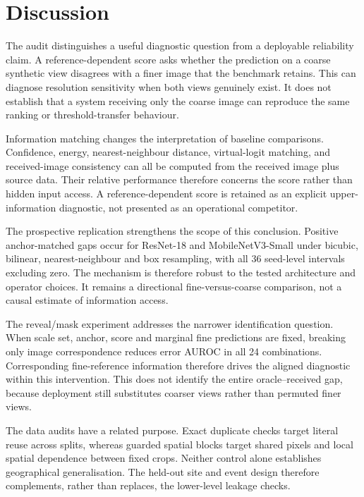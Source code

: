 \section{Discussion}

The audit distinguishes a useful diagnostic question from a deployable
reliability claim. A reference-dependent score asks whether the prediction on a
coarse synthetic view disagrees with a finer image that the benchmark retains.
This can diagnose resolution sensitivity when both views genuinely exist. It
does not establish that a system receiving only the coarse image can reproduce
the same ranking or threshold-transfer behaviour.

Information matching changes the interpretation of baseline comparisons.
Confidence, energy, nearest-neighbour distance, virtual-logit matching, and
received-image consistency can all be computed from the received image plus
source data. Their relative performance therefore concerns the score rather
than hidden input access. A reference-dependent score is retained as an
explicit upper-information diagnostic, not presented as an operational
competitor.

The prospective replication strengthens the scope of this conclusion. Positive
anchor-matched gaps occur for ResNet-18 and MobileNetV3-Small under bicubic,
bilinear, nearest-neighbour and box resampling, with all 36 seed-level
intervals excluding zero. The mechanism is therefore robust to the tested
architecture and operator choices. It remains a directional
fine-versus-coarse comparison, not a causal estimate of information access.

The reveal/mask experiment addresses the narrower identification question.
When scale set, anchor, score and marginal fine predictions are fixed, breaking
only image correspondence reduces error AUROC in all 24 combinations.
Corresponding fine-reference information therefore drives the aligned
diagnostic within this intervention. This does not identify the entire
oracle--received gap, because deployment still substitutes coarser views rather
than permuted finer views.

The data audits have a related purpose. Exact duplicate checks target literal
reuse across splits, whereas guarded spatial blocks target shared pixels and
local spatial dependence between fixed crops. Neither control alone establishes
geographical generalisation. The held-out site and event design therefore
complements, rather than replaces, the lower-level leakage checks.

